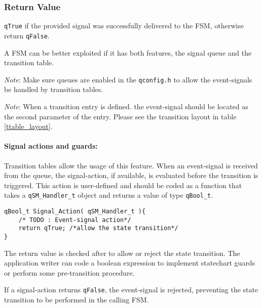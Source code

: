 \subsubsection*{Return Value}
\lstinline{qTrue} if the provided signal was successfully delivered to the FSM, otherwise return \lstinline{qFalse}.

\hrulefill
\medskip

\begin{tcolorbox}
\HandRight A FSM can be better exploited if it has both features, the signal queue and the transition table.
\end{tcolorbox}

\begin{tcolorbox}
\ArrowBoldDownRight \textit{Note}: Make sure queues are enabled in the \lstinline{qconfig.h} to allow the event-signals be handled by transition tables.
\end{tcolorbox}


\begin{tcolorbox}
\ArrowBoldDownRight \textit{Note}: When a transition entry is defined. the event-signal should be located as the second parameter of the entry. Please see the transition layout in table \ref{ttable_layout}.
\end{tcolorbox}

\paragraph{Signal actions and guards:} Transition tables allow the usage of this feature. When an event-signal is received from the queue, the signal-action, if available, is evaluated before the transition is triggered. This action is user-defined and should be coded as a function that takes a \lstinline{qSM_Handler_t} object and returns a value of type \lstinline{qBool_t}. 
\medskip

\begin{lstlisting}[style=CStyle]
qBool_t Signal_Action( qSM_Handler_t ){
    /* TODO : Event-signal action*/
    return qTrue; /*allow the state transition*/
}
\end{lstlisting}

The return value is checked after to allow or reject the state transition. The application writer can code a boolean expression to implement statechart guards or perform some pre-transition procedure.

\begin{tcolorbox}
\HandRight If a signal-action returns \lstinline{qFalse}, the event-signal is rejected, preventing the state transition to be performed in the calling FSM.
\end{tcolorbox}

